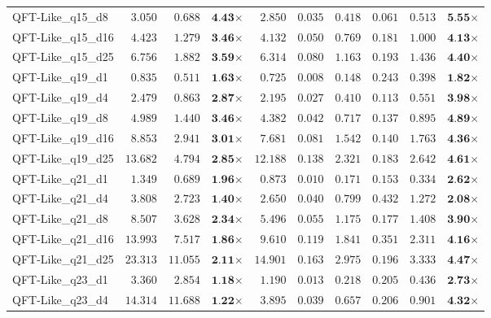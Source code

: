 \begin{table*}[t]
{\begin{tabular}{| l || r r c || r r r r r c |}
QFT-Like\_q15\_d8 & $3.050$ & $0.688$ & $\textbf{4.43}$$\times$ & $2.850$ & $0.035$ & $0.418$ & $0.061$ & $0.513$ & $\textbf{5.55}$$\times$ \\
QFT-Like\_q15\_d16 & $4.423$ & $1.279$ & $\textbf{3.46}$$\times$ & $4.132$ & $0.050$ & $0.769$ & $0.181$ & $1.000$ & $\textbf{4.13}$$\times$ \\
QFT-Like\_q15\_d25 & $6.756$ & $1.882$ & $\textbf{3.59}$$\times$ & $6.314$ & $0.080$ & $1.163$ & $0.193$ & $1.436$ & $\textbf{4.40}$$\times$ \\
QFT-Like\_q19\_d1 & $0.835$ & $0.511$ & $\textbf{1.63}$$\times$ & $0.725$ & $0.008$ & $0.148$ & $0.243$ & $0.398$ & $\textbf{1.82}$$\times$ \\
QFT-Like\_q19\_d4 & $2.479$ & $0.863$ & $\textbf{2.87}$$\times$ & $2.195$ & $0.027$ & $0.410$ & $0.113$ & $0.551$ & $\textbf{3.98}$$\times$ \\
QFT-Like\_q19\_d8 & $4.989$ & $1.440$ & $\textbf{3.46}$$\times$ & $4.382$ & $0.042$ & $0.717$ & $0.137$ & $0.895$ & $\textbf{4.89}$$\times$ \\
QFT-Like\_q19\_d16 & $8.853$ & $2.941$ & $\textbf{3.01}$$\times$ & $7.681$ & $0.081$ & $1.542$ & $0.140$ & $1.763$ & $\textbf{4.36}$$\times$ \\
QFT-Like\_q19\_d25 & $13.682$ & $4.794$ & $\textbf{2.85}$$\times$ & $12.188$ & $0.138$ & $2.321$ & $0.183$ & $2.642$ & $\textbf{4.61}$$\times$ \\
QFT-Like\_q21\_d1 & $1.349$ & $0.689$ & $\textbf{1.96}$$\times$ & $0.873$ & $0.010$ & $0.171$ & $0.153$ & $0.334$ & $\textbf{2.62}$$\times$ \\
QFT-Like\_q21\_d4 & $3.808$ & $2.723$ & $\textbf{1.40}$$\times$ & $2.650$ & $0.040$ & $0.799$ & $0.432$ & $1.272$ & $\textbf{2.08}$$\times$ \\
QFT-Like\_q21\_d8 & $8.507$ & $3.628$ & $\textbf{2.34}$$\times$ & $5.496$ & $0.055$ & $1.175$ & $0.177$ & $1.408$ & $\textbf{3.90}$$\times$ \\
QFT-Like\_q21\_d16 & $13.993$ & $7.517$ & $\textbf{1.86}$$\times$ & $9.610$ & $0.119$ & $1.841$ & $0.351$ & $2.311$ & $\textbf{4.16}$$\times$ \\
QFT-Like\_q21\_d25 & $23.313$ & $11.055$ & $\textbf{2.11}$$\times$ & $14.901$ & $0.163$ & $2.975$ & $0.196$ & $3.333$ & $\textbf{4.47}$$\times$ \\
QFT-Like\_q23\_d1 & $3.360$ & $2.854$ & $\textbf{1.18}$$\times$ & $1.190$ & $0.013$ & $0.218$ & $0.205$ & $0.436$ & $\textbf{2.73}$$\times$ \\
QFT-Like\_q23\_d4 & $14.314$ & $11.688$ & $\textbf{1.22}$$\times$ & $3.895$ & $0.039$ & $0.657$ & $0.206$ & $0.901$ & $\textbf{4.32}$$\times$ \\

\end{tabular}}
\end{table*}
